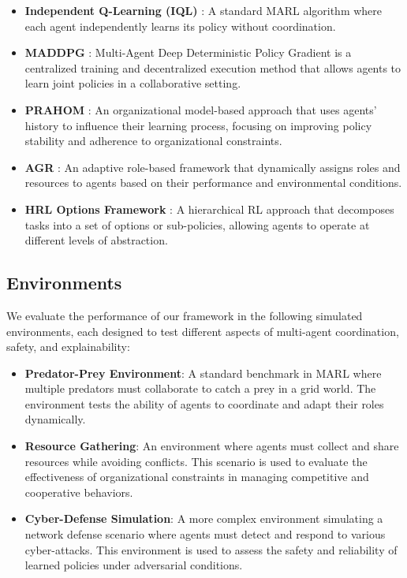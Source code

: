 \documentclass[sigconf,anonymous]{aamas}
\begin{document}
\begin{itemize}
    \item \textbf{Independent Q-Learning (IQL)} \cite{iql_reference}: A standard MARL algorithm where each agent independently learns its policy without coordination.
    \item \textbf{MADDPG} \cite{maddpg_reference}: Multi-Agent Deep Deterministic Policy Gradient is a centralized training and decentralized execution method that allows agents to learn joint policies in a collaborative setting.
    \item \textbf{PRAHOM} \cite{prahom_reference}: An organizational model-based approach that uses agents' history to influence their learning process, focusing on improving policy stability and adherence to organizational constraints.
    \item \textbf{AGR} \cite{agr_reference}: An adaptive role-based framework that dynamically assigns roles and resources to agents based on their performance and environmental conditions.
    \item \textbf{HRL Options Framework} \cite{options_hrl_reference}: A hierarchical RL approach that decomposes tasks into a set of options or sub-policies, allowing agents to operate at different levels of abstraction.
\end{itemize}

\subsection{Environments}
We evaluate the performance of our framework in the following simulated environments, each designed to test different aspects of multi-agent coordination, safety, and explainability:

\begin{itemize}
    \item \textbf{Predator-Prey Environment}: A standard benchmark in MARL where multiple predators must collaborate to catch a prey in a grid world. The environment tests the ability of agents to coordinate and adapt their roles dynamically.
    \item \textbf{Resource Gathering}: An environment where agents must collect and share resources while avoiding conflicts. This scenario is used to evaluate the effectiveness of organizational constraints in managing competitive and cooperative behaviors.
    \item \textbf{Cyber-Defense Simulation}: A more complex environment simulating a network defense scenario where agents must detect and respond to various cyber-attacks. This environment is used to assess the safety and reliability of learned policies under adversarial conditions.
\end{itemize}
\end{document}
